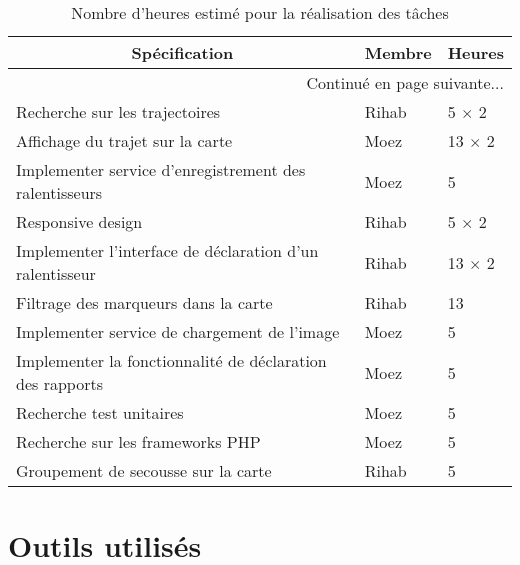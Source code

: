 \begin{center}
    \begin{longtable}{| l | l | l |}
        \caption{Nombre d'heures estimé pour la réalisation des tâches}
\label{tab:sprint2-estimation} \\

        \hline
        \multicolumn{1}{|c}{\textbf{Spécification}} &
        \multicolumn{1}{|c}{\textbf{Membre}} &
        \multicolumn{1}{|c|}{\textbf{Heures}} \\ \hline
        \endhead

        \hline \multicolumn{3}{|r|}{{Continué en page suivante$\dotsc$}} \\ \hline
        \endfoot

        \hline \hline
        \endlastfoot

        \hline
Recherche sur les trajectoires & Rihab & 5 $\times$ 2 \\ \hline
Affichage du trajet sur la carte & Moez & 13 $\times$ 2 \\ \hline
Implementer service d'enregistrement des ralentisseurs & Moez & 5 \\ \hline
Responsive design & Rihab & 5 $\times$ 2 \\ \hline
Implementer l'interface de déclaration d'un ralentisseur & Rihab & 13 $\times$ 2 \\ \hline
Filtrage des marqueurs dans la carte & Rihab & 13 \\ \hline
Implementer service de chargement de l'image & Moez & 5 \\ \hline
Implementer la fonctionnalité de déclaration des rapports & Moez & 5 \\ \hline
Recherche test unitaires & Moez & 5 \\ \hline
Recherche sur les frameworks PHP & Moez & 5 \\ \hline
Groupement de secousse sur la carte & Rihab & 5 \\ \hline
    \end{longtable}
\end{center}


\section{Outils utilisés}

